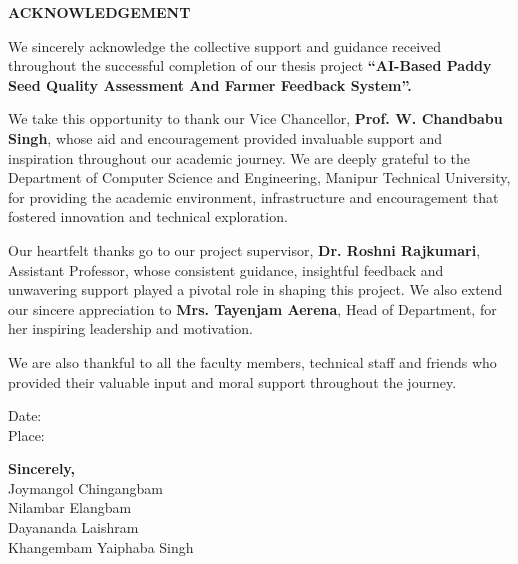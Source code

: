 \vspace{0.6cm}
\begin{center}
    {\fontsize{16}{19}\selectfont\textbf{ACKNOWLEDGEMENT}}
\end{center}
\vspace{0.5cm}
{
\fontsize{12}{14}\selectfont
\noindent
We sincerely acknowledge the collective support and guidance received throughout the successful completion of our thesis project \textbf{“AI-Based Paddy Seed Quality Assessment And Farmer Feedback System”.}

We take this opportunity to thank our Vice Chancellor, \textbf{Prof. W. Chandbabu Singh}, whose aid and encouragement provided invaluable support and inspiration throughout our academic journey. We are deeply grateful to the Department of Computer Science and Engineering, Manipur Technical University, for providing the academic environment, infrastructure and encouragement that fostered innovation and technical exploration.

Our heartfelt thanks go to our project supervisor, \textbf{Dr. Roshni Rajkumari}, Assistant Professor, whose consistent guidance, insightful feedback and unwavering support played a pivotal role in shaping this project. We also extend our sincere appreciation to \textbf{Mrs. Tayenjam Aerena}, Head of Department, for her inspiring leadership and motivation.

We are also thankful to all the faculty members, technical staff and friends who provided their valuable input and moral support throughout the journey.

\vspace{1cm}
\noindent
\begin{minipage}[t]{0.20\textwidth} %
    \begin{flushleft}
        Date: \\
        Place: 
    \end{flushleft}
\end{minipage}%
\hfill %
\begin{minipage}[t]{0.40\textwidth} %
    \begin{flushright}
    \raggedright
            \textbf{Sincerely,}\\
            Joymangol Chingangbam\\
            Nilambar Elangbam\\
            Dayananda Laishram\\
            Khangembam Yaiphaba Singh
    \end{flushright}
\end{minipage}
} 
